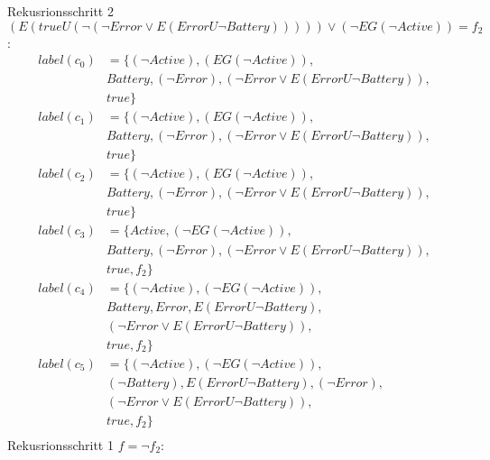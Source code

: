 Rekusrionsschritt 2\\ $\left(E (trueU (\neg(\neg Error \vee E(Error U \neg Battery))))\right) \vee \left(\neg EG( \neg Active)\right)=f_2$:
\begin{align*}
label(c_0)&=\{(\neg Active),(EG(\neg Active)),\\
&Battery,(\neg Error),(\neg Error \vee E(Error U \neg Battery)),\\
&true\}\\
label(c_1)&=\{(\neg Active),(EG(\neg Active)),\\
&Battery,(\neg Error),(\neg Error \vee E(Error U \neg Battery)),\\
&true\}\\
label(c_2)&=\{(\neg Active),(EG(\neg Active)),\\
&Battery,(\neg Error),(\neg Error \vee E(Error U \neg Battery)),\\
&true\}\\
label(c_3)&=\{Active,(\neg EG(\neg Active)),\\
&Battery,(\neg Error),(\neg Error \vee E(Error U \neg Battery)),\\
&true,f_2\}\\
label(c_4)&=\{(\neg Active),(\neg EG(\neg Active)),\\
&Battery,Error,E(Error U \neg Battery),\\
&(\neg Error \vee E(Error U \neg Battery)),\\
&true,f_2\}\\
label(c_5)&=\{(\neg Active),(\neg EG(\neg Active)),\\
&(\neg Battery),E(Error U \neg Battery),(\neg Error),\\
&(\neg Error \vee E(Error U \neg Battery)),\\
&true,f_2\}\\
\end{align*}
Rekusrionsschritt 1 $f=\neg f_2$:
